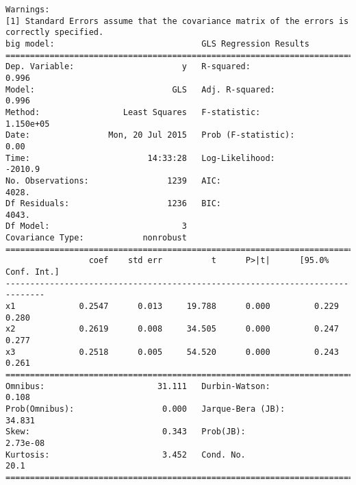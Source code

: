 \documentclass{article}
\begin{document}
\begin{verbatim}
Warnings:
[1] Standard Errors assume that the covariance matrix of the errors is correctly specified.
big model:                              GLS Regression Results                            
==============================================================================
Dep. Variable:                      y   R-squared:                       0.996
Model:                            GLS   Adj. R-squared:                  0.996
Method:                 Least Squares   F-statistic:                 1.150e+05
Date:                Mon, 20 Jul 2015   Prob (F-statistic):               0.00
Time:                        14:33:28   Log-Likelihood:                -2010.9
No. Observations:                1239   AIC:                             4028.
Df Residuals:                    1236   BIC:                             4043.
Df Model:                           3                                         
Covariance Type:            nonrobust                                         
==============================================================================
                 coef    std err          t      P>|t|      [95.0% Conf. Int.]
------------------------------------------------------------------------------
x1             0.2547      0.013     19.788      0.000         0.229     0.280
x2             0.2619      0.008     34.505      0.000         0.247     0.277
x3             0.2518      0.005     54.520      0.000         0.243     0.261
==============================================================================
Omnibus:                       31.111   Durbin-Watson:                   0.108
Prob(Omnibus):                  0.000   Jarque-Bera (JB):               34.831
Skew:                           0.343   Prob(JB):                     2.73e-08
Kurtosis:                       3.452   Cond. No.                         20.1
==============================================================================


\end{verbatim}
\end{document}
